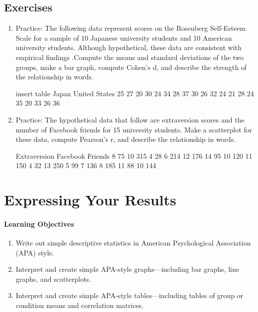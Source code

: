 \subsection{Exercises}
\begin{fullwidth}
\begin{enumerate}
\item Practice: The following data represent scores on the Rosenberg Self-Esteem Scale for a sample of 10 Japanese university students and 10 American university students. Although hypothetical, these data are consistent with empirical findings \citep{schmitt_simultaneous_2005}.Compute the means and standard deviations of the two groups, make a bar graph, compute Cohen's d, and describe the strength of the relationship in words.


insert table
Japan
United States
25
27
20
30
24
34
28
37
30
26
32
24
21
28
24
35
20
33
26
36


\item Practice: The hypothetical data that follow are extraversion scores and the number of Facebook friends for 15 university students. Make a scatterplot for these data, compute Pearson's r, and describe the relationship in words.


 Extraversion
Facebook Friends
8
75
10
315
4
28
6
214
12
176
14
95
10
120
11
150
4
32
13
250
5
99
7
136
8
185
11
88
10
144

\end{enumerate}
\end{fullwidth}


\section{Expressing Your Results}

\paragraph{Learning Objectives}
    \begin{enumerate}
    \item   Write out simple descriptive statistics in American Psychological Association (APA) style.

    \item Interpret and create simple APA-style graphs---including bar graphs, line graphs, and scatterplots.

    \item Interpret and create simple APA-style tables---including tables of group or condition means and correlation matrices.

      \end{enumerate}


